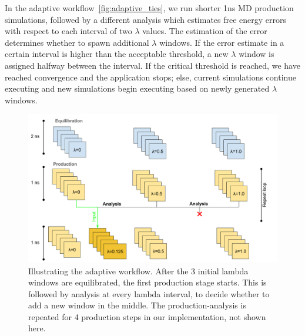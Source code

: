 In the adaptive workflow~\ref{fig:adaptive_ties}, we run shorter 1ns MD
production simulations, followed by a different 
analysis which estimates free energy errors with respect to each interval of
two $\lambda$ values. The estimation of the error determines whether
 to spawn additional
$\lambda$ windows. If the error estimate in a certain interval is higher than
the acceptable threshold, a new $\lambda$ window is assigned halfway between
the interval. If the critical threshold is reached, we have reached
convergence and the application stops; else, current simulations continue
executing and new simulations begin executing based on newly generated
$\lambda$ windows.

\begin{figure}
  \centering
  \includegraphics[width=\columnwidth]{figures/Adaptive_TIES_1.png}
  \caption{Illustrating the adaptive workflow. After the 3
  initial lambda windows are equilibrated, the first production stage starts.
  This is followed by analysis at every lambda interval, to decide whether to
  add a new window in the middle. The production-analysis is repeated for 4
  production steps in our implementation, not shown here.}
\label{fig:adaptive_TIES}
\end{figure}

